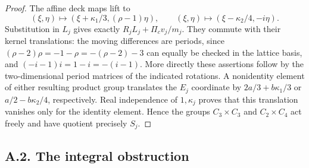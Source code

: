 \begin{proof}
The affine deck maps lift to
\[
 (\xi,\eta)\longmapsto(\xi+\kappa_1/3,(\rho-1)\eta),\qquad
 (\xi,\eta)\longmapsto(\xi-\kappa_2/4,-i\eta).
\]
Substitution in $L_j$ gives exactly $R_jL_j+\Pi_cv_j/m_j$. They commute with their kernel translations: the moving differences are periods, since $(\rho-2)\rho=-1-\rho=-(\rho-2)-3$ can equally be checked in the lattice basis, and $(-i-1)i=1-i=-(i-1)$. More directly these assertions follow by the two-dimensional period matrices of the indicated rotations. A nonidentity element of either resulting product group translates the $E_j$ coordinate by $2a/3+b\kappa_1/3$ or $a/2-b\kappa_2/4$, respectively. Real independence of $1,\kappa_j$ proves that this translation vanishes only for the identity element. Hence the groups $C_3\times C_3$ and $C_2\times C_4$ act freely and have quotient precisely $S_j$.
\end{proof}

\subsection{A.2. The integral obstruction}

